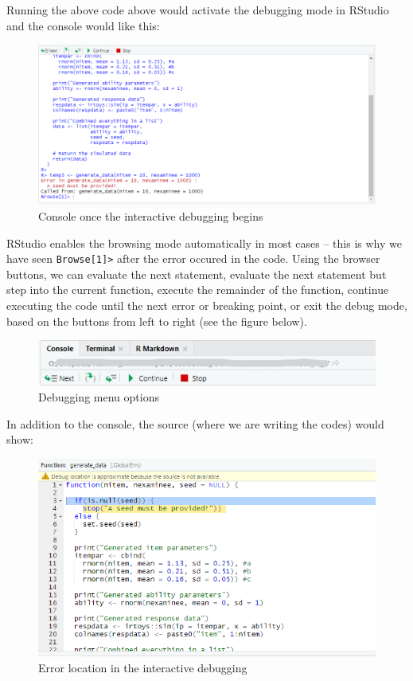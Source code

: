 \documentclass[
]{book}
\begin{document}
Running the above code above would activate the debugging mode in RStudio and the console would like this:

\begin{figure}
\centering
\includegraphics{figure/debug1.png}
\caption{Console once the interactive debugging begins}
\end{figure}

RStudio enables the browsing mode automatically in most cases -- this is why we have seen \texttt{Browse{[}1{]}\textgreater{}} after the error occured in the code. Using the browser buttons, we can evaluate the next statement, evaluate the next statement but step into the current function, execute the remainder of the function, continue executing the code until the next error or breaking point, or exit the debug mode, based on the buttons from left to right (see the figure below).

\begin{figure}
\centering
\includegraphics{figure/Inkeddebug3_LI.jpg}
\caption{Debugging menu options}
\end{figure}

In addition to the console, the source (where we are writing the codes) would show:

\begin{figure}
\centering
\includegraphics{figure/debug4.png}
\caption{Error location in the interactive debugging}
\end{figure}
\end{document}
